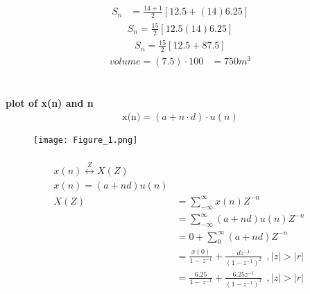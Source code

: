 \documentclass[journal,12pt,twocolumn]{IEEEtran}
\theoremstyle{remark}
\begin{document}
\begin{align}\\S_n &= \frac{14+1}{2} [12.5+(14)6.25]
\end{align}
\begin{align}
S_n = \frac{15}{2}[12.5(14)6.25]
\end{align}
   \begin{align}
   S_n = \frac{15}{2} [12.5+87.5]
   \end{align}
   \begin{align}
   volume=(7.5) \cdot 100
   &=750m^3
   \end{align}
\\\\\textbf{plot of x(n) and n}
\\\begin{align}
    \text{{x(n)}}=(a+n \cdot d ) \cdot u(n)
\end{align}
\begin{figure}[h]
    \renewcommand\thefigure{1}
    \centering
    \captionsetup{justification=centering}
    \texttt{[image: Figure\_1.png]}
    \caption{}
    \label{stemplot2}
\end{figure}\begin{align}
\\x(n)\overset{Z}{\longleftrightarrow}  X(Z)
\\x(n)=(a+nd)u(n)
\\X(Z)&=\sum_{-\infty}^{\infty}x(n)Z^{-n}\
\\&=\sum_{-\infty}^{\infty}(a+nd)u(n)Z^{-n}\
\\&=0+\sum_{0}^{\infty}(a+nd)Z^{-n}\
\\&=\frac{x(0)}{1-\,z^{-1}}+\frac{dz^{-1}}{({1-{z^{-1}}})^2}\:\:,|z|>|r|
\\&=\frac{6.25}{1-\,z^{-1}}+\frac{6.25z^{-1}}{({1-{z^{-1}}})^2}\:\:,|z|>|r|
\end{align}
 
\end{document}
